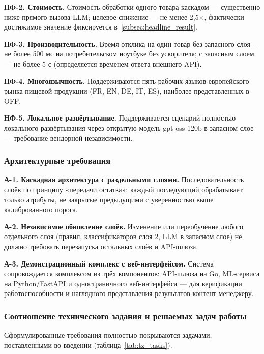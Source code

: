 \textbf{НФ-2. Стоимость.} Стоимость обработки одного товара каскадом — существенно ниже прямого вызова LLM; целевое снижение — не менее 2,5×, фактически достижимое значение фиксируется в~\ref{subsec:headline_result}.

\textbf{НФ-3. Производительность.} Время отклика на один товар без запасного слоя — не более 500 мс на потребительском ноутбуке без ускорителя; с запасным слоем — не более 5 с (определяется временем ответа внешнего API).

\textbf{НФ-4. Многоязычность.} Поддерживаются пять рабочих языков европейского рынка пищевой продукции (FR, EN, DE, IT, ES), наиболее представленных в OFF.

\textbf{НФ-5. Локальное развёртывание.} Поддерживается сценарий полностью локального развёртывания через открытую модель gpt-oss-120b в запасном слое — требование вендорной независимости.

\subsubsection{Архитектурные требования}

\textbf{А-1. Каскадная архитектура с раздельными слоями.} Последовательность слоёв по принципу «передачи остатка»: каждый последующий обрабатывает только атрибуты, не закрытые предыдущими с уверенностью выше калиброванного порога.

\textbf{А-2. Независимое обновление слоёв.} Изменение или переобучение любого отдельного слоя (правил, классификаторов слоя 2, LLM в запасном слое) не должно требовать перезапуска остальных слоёв и API-шлюза.

\textbf{А-3. Демонстрационный комплекс с веб-интерфейсом.} Система сопровождается комплексом из трёх компонентов: API-шлюза на Go, ML-сервиса на Python/FastAPI и одностраничного веб-интерфейса — для верификации работоспособности и наглядного представления результатов контент-менеджеру.

\subsubsection{Соотношение технического задания и решаемых задач работы}

Сформулированные требования полностью покрываются задачами, поставленными во введении (таблица~\ref{tab:tz_tasks}).

